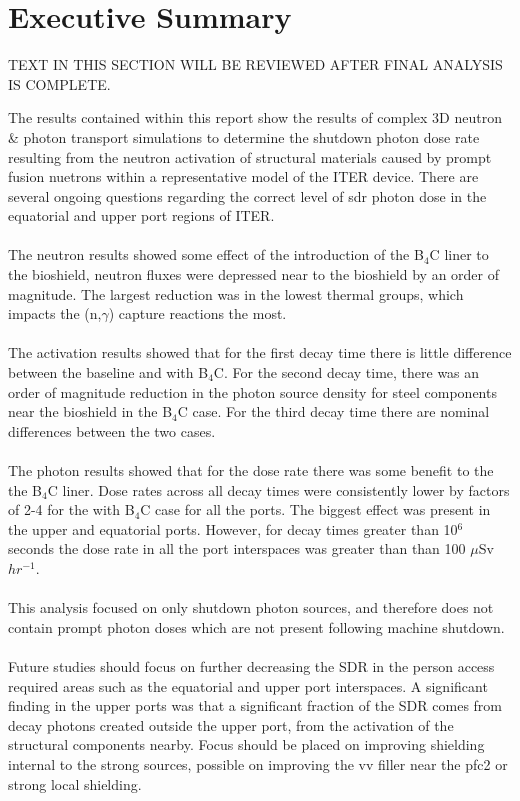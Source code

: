 \documentclass[12pt]{article}
\begin{document}
\glsresetall

\newpage
\section*{Executive Summary}

TEXT IN THIS SECTION WILL BE REVIEWED AFTER FINAL ANALYSIS IS COMPLETE.

The results contained within this report show the results of complex 3D neutron
\& photon transport simulations to determine the shutdown photon dose rate
resulting from the neutron activation of structural materials caused by prompt
fusion nuetrons within a
representative model of the ITER device. There are several ongoing questions
regarding the correct level of \gls{sdr} photon dose in the equatorial and upper
port regions of ITER.
\\
\\
The neutron results showed some effect of the introduction of the B$_4$C liner 
to the bioshield, neutron fluxes were depressed near to the bioshield by an 
order of magnitude. The largest reduction was in the lowest thermal groups, 
which impacts the (n,$\gamma$) capture reactions the most.
\\
\\
The activation results showed that for the first decay time there is little 
difference between the baseline and with B$_4$C. For the second decay time, 
there was an order of magnitude reduction in the photon source density for 
steel components near the bioshield in the B$_4$C case. For the third decay
time there are nominal differences between the two cases.
\\
\\
The photon results showed that for the dose rate there was some benefit to the 
the B$_4$C liner. Dose rates across all decay times were consistently lower
by factors of 2-4 for the with B$_4$C case for all the ports. The biggest effect
was present in the upper and equatorial ports. However, for decay times greater
than 10$^6$ seconds the dose rate in all the port interspaces was greater than
than 100 $\mu$Sv $hr^{-1}$. 
\\
\\
This analysis focused on only shutdown photon sources, and therefore does not
contain prompt photon doses which are not present following machine shutdown.
\\
\\
Future studies should focus on further decreasing the SDR in the person 
access required areas such as the equatorial and upper port interspaces. A 
significant finding in the upper ports was that a significant fraction of the
SDR comes from decay photons created outside the upper port, from the activation
of the structural components nearby. Focus should be placed on improving 
shielding internal to the strong sources, possible on improving the \gls{vv} filler
near the \gls{pfc}2 or strong local shielding. 
\end{document}
